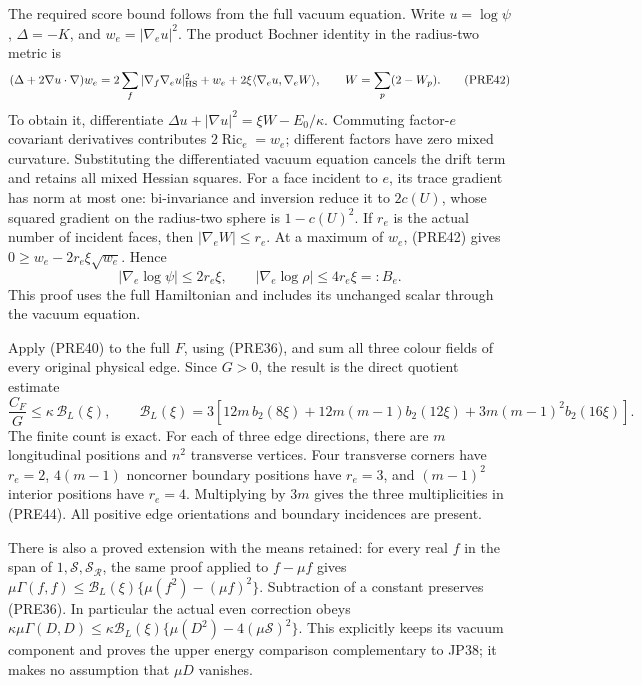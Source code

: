 \documentclass[11pt]{article}
\begin{document}
The required score bound follows from the full vacuum equation. Write \(u=\log\psi\), \(\Delta=-K\), and \(w_e=|\nabla_eu|^2\). The product Bochner identity in the radius-two metric is
\[
 (\Delta+2\nabla u\cdot\nabla)w_e
 =2\sum_f|\nabla_f\nabla_eu|_{\rm HS}^2+w_e
                  +2\xi\langle\nabla_eu,\nabla_e W\rangle,\qquad
 W=\sum_p(2-W_p).
 \tag{PRE42}
\]
To obtain it, differentiate
\(\Delta u+|\nabla u|^2=\xi W-E_0/\kappa\).
Commuting factor-\(e\) covariant derivatives contributes
\(2\operatorname{Ric}_e=w_e\); different factors have zero mixed curvature. Substituting the differentiated vacuum equation cancels the drift term and retains all mixed Hessian squares. For a face incident to \(e\), its trace gradient has norm at most one: bi-invariance and inversion reduce it to \(2c(U)\), whose squared gradient on the radius-two sphere is \(1-c(U)^2\). If \(r_e\) is the actual number of incident faces, then \(|\nabla_eW|\le r_e\). At a maximum of \(w_e\), (PRE42) gives \(0\ge w_e-2r_e\xi\sqrt{w_e}\). Hence
\[
 |\nabla_e\log\psi|\le2r_e\xi,\qquad
 |\nabla_e\log\rho|\le4r_e\xi=:B_e.
 \tag{PRE43}
\]
This proof uses the full Hamiltonian and includes its unchanged scalar through the vacuum equation.

Apply (PRE40) to the full \(F\), using (PRE36), and sum all three colour fields of every original physical edge. Since \(G>0\), the result is the direct quotient estimate
\[
 \boxed{\displaystyle
 \frac{C_F}{G}\le\kappa\,\mathcal B_L(\xi),\qquad
 \mathcal B_L(\xi)
 =3\left[
 12m\,b_2(8\xi)
 +12m(m-1)b_2(12\xi)
 +3m(m-1)^2b_2(16\xi)\right].}
 \tag{PRE44}
\]
The finite count is exact. For each of three edge directions, there are \(m\) longitudinal positions and \(n^2\) transverse vertices. Four transverse corners have \(r_e=2\), \(4(m-1)\) noncorner boundary positions have \(r_e=3\), and \((m-1)^2\) interior positions have \(r_e=4\). Multiplying by \(3m\) gives the three multiplicities in (PRE44). All positive edge orientations and boundary incidences are present.

There is also a proved extension with the means retained: for every real \(f\) in the span of \(1,\mathcal S,\mathcal S_{\mathcal R}\), the same proof applied to \(f-\mu f\) gives \(\mu\Gamma(f,f)\le\mathcal B_L(\xi)\{\mu(f^2)-(\mu f)^2\}\). Subtraction of a constant preserves (PRE36). In particular the actual even correction obeys \(\kappa\mu\Gamma(D,D)\le\kappa\mathcal B_L(\xi)\{\mu(D^2)-4(\mu\mathcal S)^2\}\). This explicitly keeps its vacuum component and proves the upper energy comparison complementary to JP38; it makes no assumption that \(\mu D\) vanishes.
\end{document}
